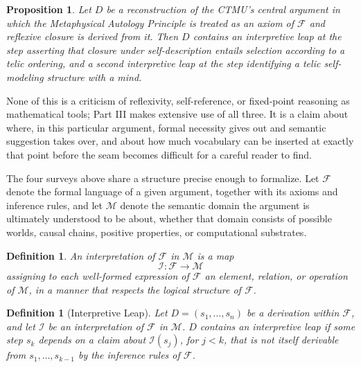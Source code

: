\documentclass[11pt]{book}
\newtheorem{definition}[theorem]{Definition}
\newtheorem{proposition}[theorem]{Proposition}
\begin{document}
\begin{proposition}
Let $D$ be a reconstruction of the CTMU's central argument in which the Metaphysical Autology Principle is treated as an axiom of $\mathcal F$ and reflexive closure is derived from it. Then $D$ contains an interpretive leap at the step asserting that closure under self-description entails selection according to a telic ordering, and a second interpretive leap at the step identifying a telic self-modeling structure with a mind.
\end{proposition}

None of this is a criticism of reflexivity, self-reference, or fixed-point reasoning as mathematical tools; Part III makes extensive use of all three. It is a claim about where, in this particular argument, formal necessity gives out and semantic suggestion takes over, and about how much vocabulary can be inserted at exactly that point before the seam becomes difficult for a careful reader to find.

The four surveys above share a structure precise enough to formalize. Let $\mathcal F$ denote the formal language of a given argument, together with its axioms and inference rules, and let $\mathcal M$ denote the semantic domain the argument is ultimately understood to be about, whether that domain consists of possible worlds, causal chains, positive properties, or computational substrates.

\begin{definition}
An \emph{interpretation} of $\mathcal F$ in $\mathcal M$ is a map
\[
\mathcal I : \mathcal F \rightarrow \mathcal M
\]
assigning to each well-formed expression of $\mathcal F$ an element, relation, or operation of $\mathcal M$, in a manner that respects the logical structure of $\mathcal F$.
\end{definition}

\begin{definition}[Interpretive Leap]
Let $D = (s_1, \dots, s_n)$ be a derivation within $\mathcal F$, and let $\mathcal I$ be an interpretation of $\mathcal F$ in $\mathcal M$. $D$ contains an \emph{interpretive leap} if some step $s_k$ depends on a claim about $\mathcal I(s_j)$, for $j < k$, that is not itself derivable from $s_1, \dots, s_{k-1}$ by the inference rules of $\mathcal F$.
\end{definition}
\end{document}
